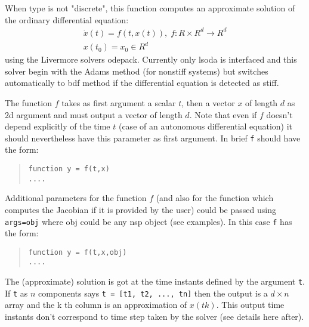\begin{mandescription}

When type is not "discrete", this function computes an approximate solution of the ordinary differential equation:
$$
\begin{array}{l}
   \dot{x}(t) = f(t, x(t)), \; f: R \times R^d \rightarrow  R^d \\
   x(t_0) = x_0  \in  R^d
\end{array}
$$
using the Livermore solvers odepack. Currently only lsoda is interfaced and this solver begin with the Adams
method (for nonstiff systems) but switches  automatically to bdf method if the differential equation is detected
as stiff. 

The function $f$ takes as first argument a scalar $t$, then a vector $x$ of length $d$ as 2d argument and 
must output a vector of length $d$. Note that even if $f$ doesn't depend explicitly of the time $t$ (case of an autonomous differential equation)
it should nevertheless have this parameter as first argument. In brief \verb+f+ should have the
form:
\begin{quote}
{\tt function y = f(t,x) \\
      ....}
  \end{quote}

Additional parameters for the function $f$ (and also for the function which computes the Jacobian 
if it is provided by the user) could be passed using \verb+args=obj+ where obj could be any nsp 
object (see examples). In this case \verb+f+ has the form:
\begin{quote}
{\tt function y = f(t,x,obj) \\
      ....}
\end{quote}

The (approximate) solution is got at the time instants defined by the argument \verb+t+.
If \verb+t+ as $n$ components says  \verb+t = [t1, t2, ..., tn]+ then the output is a
$d \times n$ array and the k th column is an approximation of $x(tk)$. This output
time instants don't correspond to time step taken by the solver (see details here
after).



\end{mandescription}
